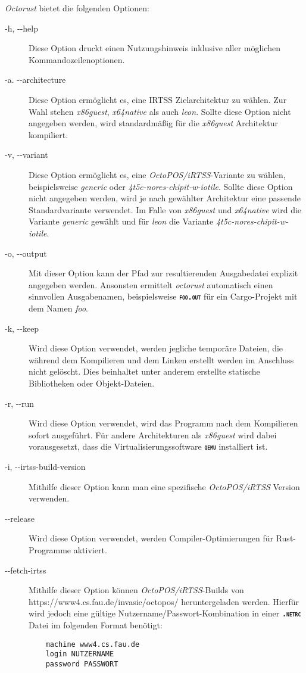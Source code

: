 \textit{Octorust} bietet die folgenden Optionen:
\begin{description}

	\item[-h, -{}-help]
	Diese Option druckt einen Nutzungshinweis inklusive aller möglichen Kommandozeilenoptionen.
	
	\item[-a. -{}-architecture]
	Diese Option ermöglicht es, eine IRTSS Zielarchitektur zu wählen. Zur Wahl stehen \textit{x86guest},
	\textit{x64native} als auch \textit{leon}.
	Sollte diese Option nicht angegeben werden, wird standardmäßig für die \textit{x86guest} Architektur kompiliert.
	
	\item[-v, -{}-variant]
	Diese Option ermöglicht es, eine \textit{OctoPOS/iRTSS}-Variante zu wählen,
	beispielsweise \textit{generic} oder \textit{4t5c-nores-chipit-w-iotile}.
	Sollte diese Option nicht angegeben werden, wird je nach gewählter Architektur
	eine passende Standardvariante verwendet.
	Im Falle von \textit{x86guest} und \textit{x64native} wird die Variante \textit{generic} gewählt und für 
	\textit{leon} die Variante \textit{4t5c-nores-chipit-w-iotile}.
	
	\item[-o, -{}-output]
	Mit dieser Option kann der Pfad zur resultierenden Ausgabedatei explizit angegeben	werden.
	Ansonsten ermittelt \textit{octorust} automatisch einen sinnvollen Ausgabenamen,
	beispielsweise \texttt{\textsc{\textbf{foo.out}}} für ein Cargo-Projekt mit dem Namen
	\textit{foo}.
	
	\item[-k, -{}-keep]
	Wird diese Option verwendet, werden jegliche temporäre Dateien,
	die während dem Kompilieren und dem Linken erstellt werden im
	Anschluss nicht gelöscht.
	Dies beinhaltet unter anderem erstellte statische Bibliotheken oder Objekt-Dateien.
	
	\item[-r, -{}-run]
	Wird diese Option verwendet, wird das Programm nach dem Kompilieren sofort ausgeführt.
	Für andere Architekturen als \textit{x86guest} wird dabei vorausgesetzt,
	dass die Virtualisierungssoftware \texttt{\textsc{\textbf{qemu}}} installiert ist.
	
	\item[-i, -{}-irtss-build-version]
	Mithilfe dieser Option kann man eine spezifische \textit{OctoPOS/iRTSS} Version verwenden.
	
	\item[-{}-release]
	Wird diese Option verwendet, werden Compiler-Optimierungen für Rust-Programme aktiviert.
	
	\item[-{}-fetch-irtss]
	Mithilfe dieser Option können \textit{OctoPOS/iRTSS}-Builds von \\
	https://www4.cs.fau.de/invasic/octopos/ heruntergeladen werden. Hierfür wird jedoch
	eine gültige Nutzername/Passwort-Kombination in einer \texttt{\textsc{\textbf{.netrc}}}
	Datei im folgenden Format benötigt:
	\begin{verbatim}
	machine www4.cs.fau.de
	login NUTZERNAME
	password PASSWORT
	\end{verbatim}
\end{description}
